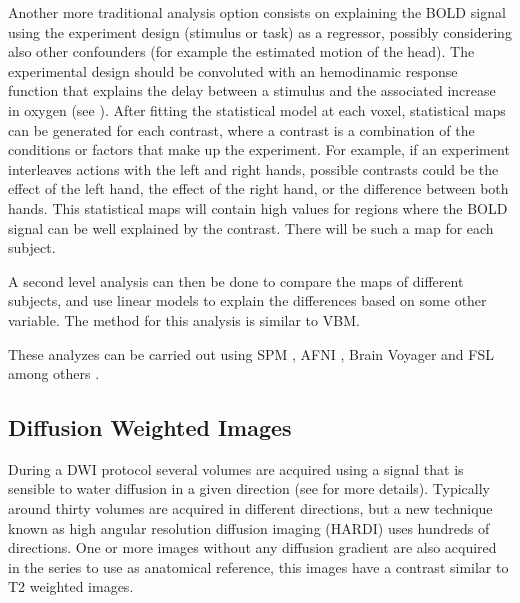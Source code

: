 Another more traditional analysis option consists on explaining the BOLD signal using the experiment design (stimulus or task) as a regressor, possibly considering also other confounders (for example the estimated motion of the head). The experimental design should be convoluted with an hemodinamic response function that explains the delay between a stimulus and the associated increase in oxygen (see \autocite{poldrack_handbook_2011}). After fitting the statistical model at each voxel, statistical maps can be generated for each contrast, where a contrast is a combination of the conditions or factors that make up the experiment. For example, if an experiment interleaves actions with the left and right hands, possible contrasts could be the effect of the left hand, the effect of the right hand, or the difference between both hands. This statistical maps will contain high values for regions where the BOLD signal can be well explained by the contrast. There will be such a map for each subject.

A second level analysis can then be done to compare the maps of different subjects, and use linear models to explain the differences based on some other variable. The method for this analysis is similar to VBM. 

These analyzes can be carried out using SPM \autocite{friston_statistical_2007}, AFNI \autocite{cox_afni:_1996}, Brain Voyager \autocite{goebel_brainvoyagerpast_2012} and FSL \autocite{jenkinson_fsl_2012} among others \autocite{gold_functional_1998}.


\subsection{Diffusion Weighted Images}


During a DWI protocol several volumes are acquired using a signal that is sensible to water diffusion in a given direction (see \autocite{jellison_diffusion_2004} for more details). Typically around thirty volumes are acquired in different directions, but a new technique known as high angular resolution diffusion imaging (HARDI) uses hundreds of directions. One or more images without any diffusion gradient are also acquired in the series to use as anatomical reference, this images have a contrast similar to T2 weighted images.

